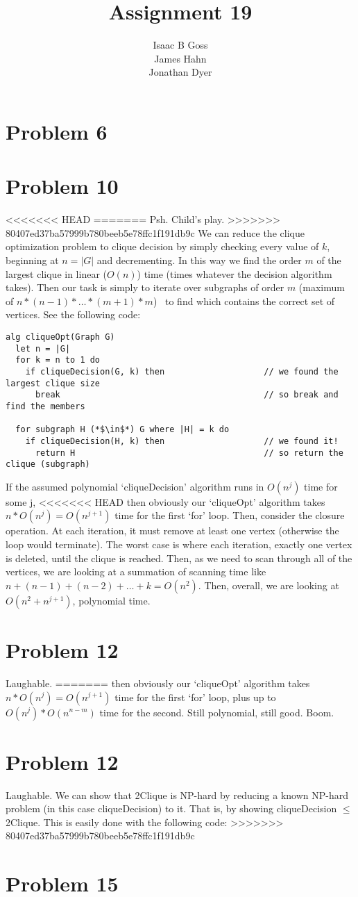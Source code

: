 \documentclass{article}
\author{Isaac B Goss\\ James Hahn\\ Jonathan Dyer}
\title{Assignment 19}
\providecommand{\prob}[1]{\section*{Problem #1}}
\begin{document}
\maketitle
\prob{6}




\prob{10}
<<<<<<< HEAD
=======
Psh. Child's play.
>>>>>>> 80407ed37ba57999b780beeb5e78ffc1f191db9c
We can reduce the clique optimization problem to clique decision by simply checking every value of $k$,
beginning at $n = |G|$ and decrementing.
In this way we find the order $m$ of the largest clique in linear ($O(n)$) time (times whatever the decision algorithm takes).
Then our task is simply to iterate over subgraphs of order $m$ (maximum of $n*(n-1)*\dots*(m+1)*m$) \
to find which contains the correct set of vertices. See the following code:
\begin{lstlisting}
alg cliqueOpt(Graph G)
  let n = |G|
  for k = n to 1 do
    if cliqueDecision(G, k) then                    // we found the largest clique size
      break                                         // so break and find the members

  for subgraph H (*$\in$*) G where |H| = k do
    if cliqueDecision(H, k) then                    // we found it!
      return H                                      // so return the clique (subgraph)
\end{lstlisting}
If the assumed polynomial `cliqueDecision' algorithm runs in $O(n^j)$ time for some j,
<<<<<<< HEAD
then obviously our `cliqueOpt' algorithm takes $n*O(n^j) = O(n^{j+1})$ time for the first `for' loop.
Then, consider the closure operation.
At each iteration, it must remove at least one vertex (otherwise the loop would terminate).
The worst case is where each iteration, exactly one vertex is deleted, until the clique is reached.
Then, as we need to scan through all of the vertices,
we are looking at a summation of scanning time like $n + (n-1) + (n-2) + \dots + k = O(n^2)$.
Then, overall, we are looking at $O(n^2 + n^{j+1})$, polynomial time.


\prob{12}
Laughable.
=======
then obviously our `cliqueOpt' algorithm takes $n*O(n^j) = O(n^{j+1})$ time for the first `for' loop,
plus up to $O(n^j) * O(n^{n-m})$ time for the second.
Still polynomial, still good. Boom.

\prob{12}
Laughable.
We can show that 2Clique is NP-hard by reducing a known NP-hard problem (in this case cliqueDecision) to it. That is, by showing
cliqueDecision $\leq$ 2Clique. This is easily done with the following code:
>>>>>>> 80407ed37ba57999b780beeb5e78ffc1f191db9c


\prob{15}
\end{document}
